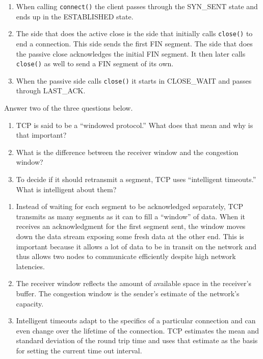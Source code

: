 \documentclass[12pt]{examdesign}
\begin{document}
\begin{shortanswer}
\begin{question}
    \begin{answer}
    \begin{enumerate}
    
    \item When calling \texttt{connect()} the client passes through the SYN\_SENT state and ends
      up in the ESTABLISHED state.
    \item The side that does the active close is the side that initially calls \texttt{close()}
      to end a connection. This side sends the first FIN segment. The side that does the passive
      close acknowledges the initial FIN segment. It then later calls \texttt{close()} as well
      to send a FIN segment of its own.
    \item When the passive side calls \texttt{close()} it starts in CLOSE\_WAIT and passes
    through LAST\_ACK.
    \end{enumerate}
    \end{answer}
  \end{question}


  \begin{question}
    Answer two of the three questions below.
    \begin{enumerate}
    \item TCP is said to be a ``windowed protocol.'' What does that mean and why is that
      important?
    \item What is the difference between the receiver window and the congestion window?
    \item To decide if it should retransmit a segment, TCP uses ``intelligent timeouts.'' What
      is intelligent about them?
    \end{enumerate}

    \begin{answer}
    \begin{enumerate}
    \item Instead of waiting for each segment to be acknowledged separately, TCP transmits as
      many segments as it can to fill a ``window'' of data. When it receives an acknowledgment
      for the first segment sent, the window moves down the data stream exposing some fresh data
      at the other end. This is important because it allows a lot of data to be in transit on
      the network and thus allows two nodes to communicate efficiently despite high network
      latencies.
    \item The receiver window reflects the amount of available space in the receiver's buffer.
      The congestion window is the sender's estimate of the network's capacity.
    \item Intelligent timeouts adapt to the specifics of a particular connection and can even
      change over the lifetime of the connection. TCP estimates the mean and standard deviation
      of the round trip time and uses that estimate as the basis for setting the current time
      out interval.
    \end{enumerate}
    \end{answer}
  \end{question}


\end{shortanswer}
\end{document}

